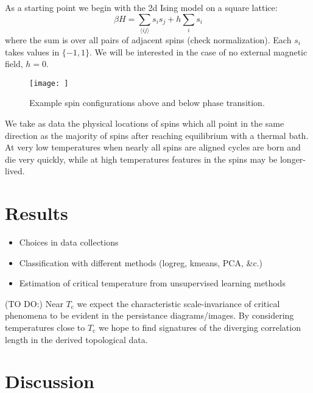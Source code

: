 \documentclass[11pt]{article}
\begin{document}
As a starting point we begin with the 2d Ising model on a square lattice:
\begin{equation}
    \beta H = \sum_{\langle ij\rangle}s_is_j + h\sum_is_i
\end{equation}
where the sum is over all pairs of adjacent spins (check normalization). Each $s_i$ takes values in $\{-1,1\}$. We will be interested in the case of no external magnetic field, $h=0$.

\begin{figure}[t]
    \centering
    \texttt{[image: ]}
    \caption{Example spin configurations above and below phase transition.}
\end{figure}

We take as data the physical locations of spins which all point in the same direction as the majority of spins after reaching equilibrium with a thermal bath. At very low temperatures when nearly all spins are aligned cycles are born and die very quickly, while at high temperatures features in the spins may be longer-lived.


\section{Results}
\begin{itemize}
    \item Choices in data collections
    \item Classification with different methods (logreg, kmeans, PCA, \&c.)
    \item Estimation of critical temperature from unsupervised learning methods
\end{itemize}

(TO DO:) Near $T_\text{c}$ we expect the characteristic scale-invariance of critical phenomena to be evident in the persistance diagrams/images. By considering temperatures close to $T_\text{c}$ we hope to find signatures of the diverging correlation length in the derived topological data.


\section{Discussion}
\end{document}
